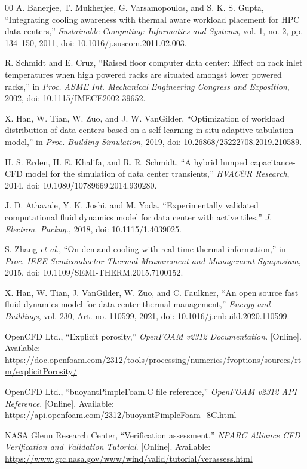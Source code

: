 \documentclass{ieeeaccess}
\begin{document}

\begin{thebibliography}{00}
A. Banerjee, T. Mukherjee, G. Varsamopoulos, and S. K. S. Gupta,
``Integrating cooling awareness with thermal aware workload placement for HPC data centers,''
\emph{Sustainable Computing: Informatics and Systems}, vol. 1, no. 2,
pp. 134--150, 2011, doi: 10.1016/j.suscom.2011.02.003.

R. Schmidt and E. Cruz,
``Raised floor computer data center: Effect on rack inlet temperatures when high powered racks are situated amongst lower powered racks,''
in \emph{Proc. ASME Int. Mechanical Engineering Congress and Exposition}, 2002, doi: 10.1115/IMECE2002-39652.

X. Han, W. Tian, W. Zuo, and J. W. VanGilder,
``Optimization of workload distribution of data centers based on a self-learning in situ adaptive tabulation model,''
in \emph{Proc. Building Simulation}, 2019, doi: 10.26868/25222708.2019.210589.

H. S. Erden, H. E. Khalifa, and R. R. Schmidt,
``A hybrid lumped capacitance-CFD model for the simulation of data center transients,''
\emph{HVAC\&R Research}, 2014, doi: 10.1080/10789669.2014.930280.

J. D. Athavale, Y. K. Joshi, and M. Yoda,
``Experimentally validated computational fluid dynamics model for data center with active tiles,''
\emph{J. Electron. Packag.}, 2018, doi: 10.1115/1.4039025.

S. Zhang \emph{et al.}, ``On demand cooling with real time thermal information,''
in \emph{Proc. IEEE Semiconductor Thermal Measurement and Management Symposium}, 2015, doi: 10.1109/SEMI-THERM.2015.7100152.

X. Han, W. Tian, J. VanGilder, W. Zuo, and C. Faulkner,
``An open source fast fluid dynamics model for data center thermal management,''
\emph{Energy and Buildings}, vol. 230, Art. no. 110599, 2021,
doi: 10.1016/j.enbuild.2020.110599.

OpenCFD Ltd., ``Explicit porosity,'' \emph{OpenFOAM v2312 Documentation}.
[Online]. Available: \url{https://doc.openfoam.com/2312/tools/processing/numerics/fvoptions/sources/rtm/explicitPorosity/}

OpenCFD Ltd., ``buoyantPimpleFoam.C file reference,'' \emph{OpenFOAM v2312 API Reference}.
[Online]. Available: \url{https://api.openfoam.com/2312/buoyantPimpleFoam_8C.html}

NASA Glenn Research Center, ``Verification assessment,'' \emph{NPARC Alliance CFD Verification and Validation Tutorial}.
[Online]. Available: \url{https://www.grc.nasa.gov/www/wind/valid/tutorial/verassess.html}
\end{thebibliography}

\EOD
\end{document}
